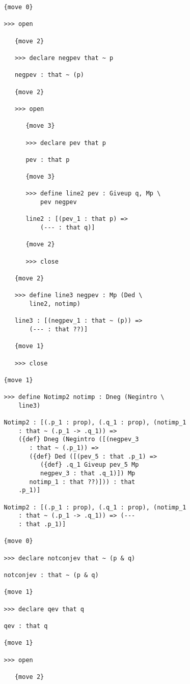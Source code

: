\documentclass[12pt]{article}
\begin{document}
\begin{verbatim}
   {move 0}

   >>> open

      {move 2}

      >>> declare negpev that ~ p

      negpev : that ~ (p)

      {move 2}

      >>> open

         {move 3}

         >>> declare pev that p

         pev : that p

         {move 3}

         >>> define line2 pev : Giveup q, Mp \
             pev negpev

         line2 : [(pev_1 : that p) => 
             (--- : that q)]

         {move 2}

         >>> close

      {move 2}

      >>> define line3 negpev : Mp (Ded \
          line2, notimp)

      line3 : [(negpev_1 : that ~ (p)) => 
          (--- : that ??)]

      {move 1}

      >>> close

   {move 1}

   >>> define Notimp2 notimp : Dneg (Negintro \
       line3)

   Notimp2 : [(.p_1 : prop), (.q_1 : prop), (notimp_1 
       : that ~ (.p_1 -> .q_1)) => 
       ({def} Dneg (Negintro ([(negpev_3 
          : that ~ (.p_1)) => 
          ({def} Ded ([(pev_5 : that .p_1) => 
             ({def} .q_1 Giveup pev_5 Mp 
             negpev_3 : that .q_1)]) Mp 
          notimp_1 : that ??)])) : that 
       .p_1)]

   Notimp2 : [(.p_1 : prop), (.q_1 : prop), (notimp_1 
       : that ~ (.p_1 -> .q_1)) => (--- 
       : that .p_1)]

   {move 0}

   >>> declare notconjev that ~ (p & q)

   notconjev : that ~ (p & q)

   {move 1}

   >>> declare qev that q

   qev : that q

   {move 1}

   >>> open

      {move 2}


\end{verbatim}
\end{document}
